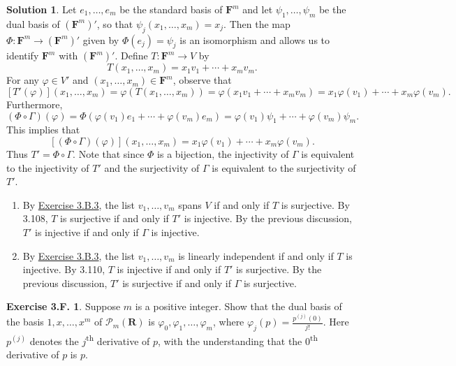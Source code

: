 \documentclass[12pt]{article}
\theoremstyle{definition}
\theoremstyle{exercise}
\newtheorem{exercise}{Exercise 3.F.}
\theoremstyle{solution}
\newtheorem*{solution}{Solution}
\newcommand{\poly}{\mathcal{P}}
\newcommand{\ts}{\textsuperscript}
\newcommand{\R}{\mathbf{R}}
\newcommand{\F}{\mathbf{F}}
\begin{document}
\begin{solution}
    Let \( e_1, \ldots, e_m \) be the standard basis of \( \F^m \) and let \( \psi_1, \ldots, \psi_m \) be the dual basis of \( (\F^m)' \), so that \( \psi_j(x_1, \ldots, x_m) = x_j \). Then the map \( \Phi : \F^m \to (\F^m)' \) given by \( \Phi(e_j) = \psi_j \) is an isomorphism and allows us to identify \( \F^m \) with \( (\F^m)' \). Define \( T : \F^m \to V \) by
    \[
        T(x_1, \ldots, x_m) = x_1 v_1 + \cdots + x_m v_m.
    \]
    For any \( \varphi \in V' \) and \( (x_1, \ldots, x_m) \in \F^m \), observe that
    \[
        [T'(\varphi)](x_1, \ldots, x_m) = \varphi(T(x_1, \ldots, x_m)) = \varphi(x_1 v_1 + \cdots + x_m v_m) = x_1 \varphi(v_1) + \cdots + x_m \varphi(v_m).
    \]
    Furthermore,
    \[
        (\Phi \circ \Gamma)(\varphi) = \Phi(\varphi(v_1) e_1 + \cdots + \varphi(v_m) e_m) = \varphi(v_1) \psi_1 + \cdots + \varphi(v_m) \psi_m.  
    \]
    This implies that
    \[
        [(\Phi \circ \Gamma)(\varphi)](x_1, \ldots, x_m) = x_1 \varphi(v_1) + \cdots + x_m \varphi(v_m).
    \]
    Thus \( T' = \Phi \circ \Gamma \). Note that since \( \Phi \) is a bijection, the injectivity of \( \Gamma \) is equivalent to the injectivity of \( T' \) and the surjectivity of \( \Gamma \) is equivalent to the surjectivity of \( T' \).
    \begin{enumerate}
        \item By \href{https://lew98.github.io/Mathematics/LADR_Section_3_B_Exercises.pdf}{Exercise 3.B.3}, the list \( v_1, \ldots, v_m \) spans \( V \) if and only if \( T \) is surjective. By 3.108, \( T \) is surjective if and only if \( T' \) is injective. By the previous discussion, \( T' \) is injective if and only if \( \Gamma \) is injective.

        \item By \href{https://lew98.github.io/Mathematics/LADR_Section_3_B_Exercises.pdf}{Exercise 3.B.3}, the list \( v_1, \ldots, v_m \) is linearly independent if and only if \( T \) is injective. By 3.110, \( T \) is injective if and only if \( T' \) is surjective. By the previous discussion, \( T' \) is surjective if and only if \( \Gamma \) is surjective.
    \end{enumerate}
\end{solution}

\begin{exercise}
\label{ex:7}
    Suppose \( m \) is a positive integer. Show that the dual basis of the basis \( 1, x, \ldots, x^m \) of \( \poly_m(\R) \) is \( \varphi_0, \varphi_1, \ldots, \varphi_m \), where \( \varphi_j(p) = \tfrac{p^{(j)}(0)}{j!} \). Here \( p^{(j)} \) denotes the \( j \)\ts{th} derivative of \( p \), with the understanding that the 0\ts{th} derivative of \( p \) is \( p \).
\end{exercise}
\end{document}
